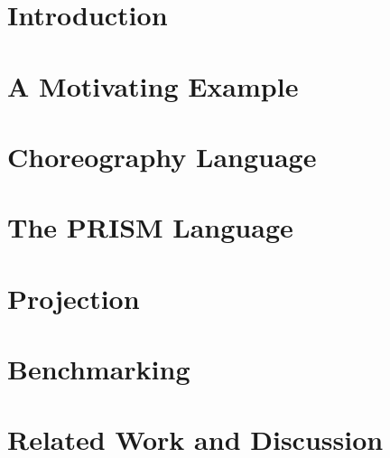 \documentclass{lmcs} %
\theoremstyle{plain}\newtheorem{satz}[thm]{Satz} %
\begin{document}
\maketitle

\section{Introduction}\label{sec:intro}


\section{A Motivating Example}\label{sec:example}


\section{Choreography Language}\label{sec:chor}


\section{The PRISM Language}\label{sec:prism}


\section{Projection}\label{sec:proj}


%

\section{Benchmarking}\label{sec:bench}


\section{Related Work and Discussion}\label{sec:relwork}



%


\end{document}
